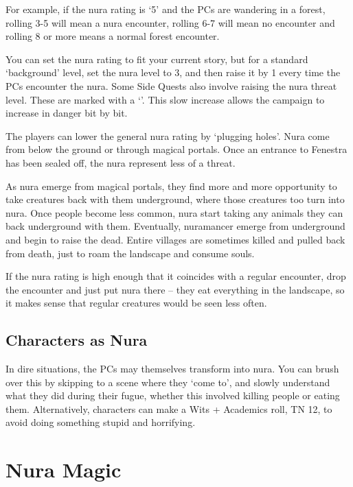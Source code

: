 \begin{multicols}{2}
For example, if the nura rating is `5' and the PCs are wandering in a forest, rolling 3-5 will mean a nura encounter, rolling 6-7 will mean no encounter and rolling 8 or more means a normal forest encounter.

You can set the nura rating to fit your current story, but for a standard `background' level, set the nura level to 3, and then raise it by 1 every time the PCs encounter the nura.
Some Side Quests also involve raising the nura threat level.  These are marked with a `\N'.
This slow increase allows the campaign to increase in danger bit by bit.

The players can lower the general nura rating by `plugging holes'.
Nura come from below the ground or through magical portals.
Once an entrance to Fenestra has been sealed off, the nura represent less of a threat.

As nura emerge from magical portals, they find more and more opportunity to take creatures back with them underground, where those creatures too turn into nura.
Once people become less common, nura start taking any animals they can back underground with them.
Eventually, nuramancer emerge from underground and begin to raise the dead.
Entire villages are sometimes killed and pulled back from death, just to roam the landscape and consume souls.

If the nura rating is high enough that it coincides with a regular encounter, drop the encounter and just put nura there -- they eat everything in the landscape, so it makes sense that regular creatures would be seen less often.

\subsection{Characters as Nura}

In dire situations, the PCs may themselves transform into nura.
You can brush over this by skipping to a scene where they `come to', and slowly understand what they did during their fugue, whether this involved killing people or eating them.
Alternatively, characters can make a Wits + Academics roll, TN 12, to avoid doing something stupid and horrifying.

\end{multicols}

\section{Nura Magic}\label{saurecanta}

